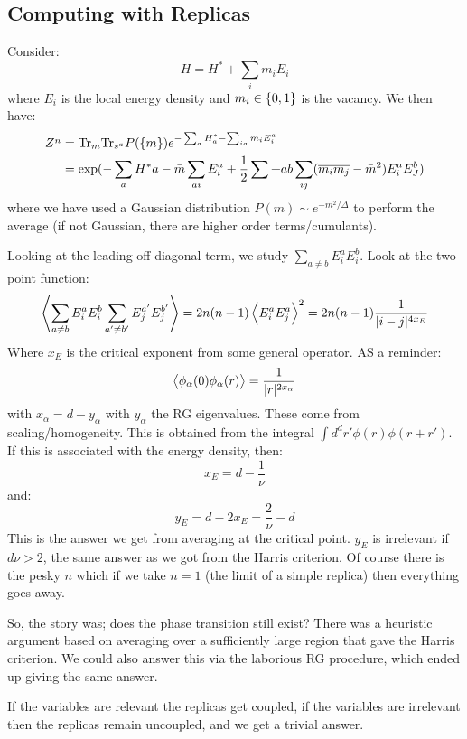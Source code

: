 \subsection{Computing with Replicas}
Consider:
\begin{equation}
    H = H^* + \sum_i m_i E_i
\end{equation}
where $E_i$ is the local energy density and $m_i \in \set{0, 1}$ is the vacancy. We then have:
\begin{equation}
    \begin{split}
        \bar{Z^n} &= \mathrm{Tr}_m \mathrm{Tr}_{s^a}P(\set{m}) e^{-\sum_a H^*_a - \sum_{ia}m_i E_i^a}
        \\ &= \exp(-\sum_a H^* a -\bar{m}\sum_{ai}E_i^a + \frac{1}{2}\sum+{ab}\sum_{ij}(\overline{m_im_j} - \bar{m}^2)E_i^aE_J^b)
    \end{split}
\end{equation}
where we have used a Gaussian distribution $P(m) \sim e^{-m^2/\Delta}$ to perform the average (if not Gaussian, there are higher order terms/cumulants).

Looking at the leading off-diagonal term, we study $\sum_{a \neq b}E_i^aE_i^b$. Look at the two point function:
\begin{equation}
    \left< \sum_{a\neq b}E_i^a E_i^b \sum_{a'\neq b'}E_j^{a'}E_j^{b'} \right> = 2n(n-1)\left< E^a_iE^a_j \right>^2 = 2n(n-1)\frac{1}{\lvert i-j \rvert^{4x_E}}
\end{equation}
Where $x_E$ is the critical exponent from some general operator. AS a reminder:
\begin{equation}
    \left< \phi_\alpha(0)\phi_\alpha(r) \right> = \frac{1}{\lvert r \rvert^{2x_\alpha}}
\end{equation}
with $x_\alpha = d - y_\alpha$ with $y_\alpha$ the RG eigenvalues. These come from scaling/homogeneity. This is obtained from the integral $\int d^dr'\phi(r)\phi(r+r')$. If this is associated with the energy density, then:
\begin{equation}
    x_E = d - \frac{1}{\nu}
\end{equation}
and:
\begin{equation}
    y_E = d - 2x_E = \frac{2}{\nu} - d
\end{equation}
This is the answer we get from averaging at the critical point. $y_E$ is irrelevant if $d\nu > 2$, the same answer as we got from the Harris criterion. Of course there is the pesky $n$ which if we take $n = 1$ (the limit of a simple replica) then everything goes away.

So, the story was; does the phase transition still exist? There was a heuristic argument based on averaging over a sufficiently large region that gave the Harris criterion. We could also answer this via the laborious RG procedure, which ended up giving the same answer.

If the variables are relevant the replicas get coupled, if the variables are irrelevant then the replicas remain uncoupled, and we get a trivial answer.
